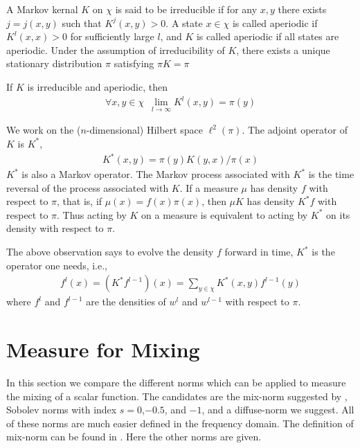 \documentclass{article}
\begin{document}
A Markov kernal $K$ on $\chi$ is said to be irreducible if for any
$x,y$ there exists $j = j(x,y)$ such that $K^j(x,y)>0$. A state
$x\in\chi$ is called aperiodic if $K^l(x,x)>0$ for sufficiently
large $l$, and $K$ is called aperiodic if all states are aperiodic.
Under the assumption of irreducibility of $K$, there exists a unique
stationary distribution $\pi$ satisfying $\pi K =\pi$

If $K$ is irreducible and aperiodic, then
\begin{eqnarray*}
\forall x,y \in \chi \,\,\, \lim_{l \rightarrow \infty}
K^l(x,y)=\pi(y)
\end{eqnarray*}



We work on the ($n$-dimensional) Hilbert space $\ell^2(\pi)$. The
adjoint operator of $K$ is $K^*$,
\begin{eqnarray*}
\label{Kadjoint}
  K^*(x,y) = \pi(y)K(y,x)/\pi(x)
\end{eqnarray*}
$K^*$ is also a Markov operator. The Markov process associated with
$K^*$ is the time reversal of the process associated with $K$. If a
measure $\mu$ has density $f$ with respect to $\pi$, that is, if
$\mu(x)=f(x)\pi(x)$, then $\mu K$ has density $K^*f$ with respect to
$\pi$. Thus acting by $K$ on a measure is equivalent to acting by
$K^*$ on its density with respect to $\pi$.

The above observation says to evolve the density $f$ forward in
time, $K^*$ is the operator one needs, i.e.,
\begin{eqnarray*}
\label{fevolve}
f^l(x) =  (K^*f^{l-1})(x)= \sum_{y \in \chi}
K^*(x,y)f^{l-1}(y)
\end{eqnarray*}
where $f^l$ and $f^{l-1}$ are the densities of $w^l$ and $w^{l-1}$
with respect to $\pi$.





\section{Measure for Mixing}
\label{Measure for Mixing}
In this section we compare the different norms which can be applied
to measure the mixing of a scalar function. The candidates are the
mix-norm suggested by \cite{Mezic2005}, Sobolev norms with index $s
= 0$,$-0.5$, and $-1$, and a diffuse-norm we suggest. All of these
norms are much easier defined in the frequency domain. The
definition of mix-norm can be found in \cite{Mezic2005}. Here the
other norms are given.
\end{document}
